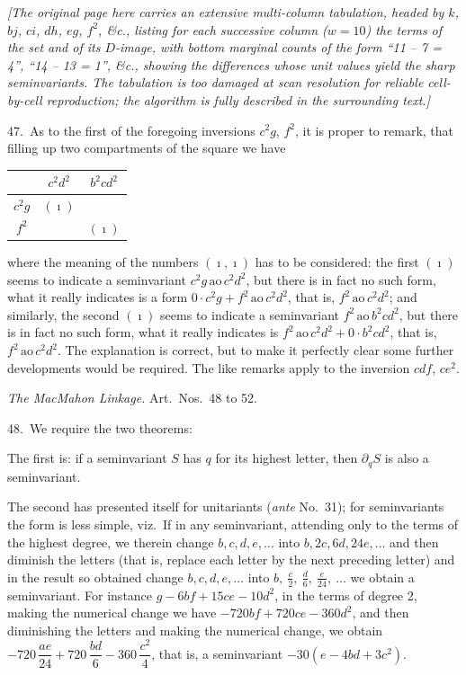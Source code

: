 \documentclass[11pt]{article}
\begin{document}
\bigskip
\noindent\textit{[The original page here carries an extensive multi-column tabulation, headed by $k$, $bj$, $ci$, $dh$, $eg$, $f^2$, \&c., listing for each successive column ($w=10$) the terms of the set and of its $D$-image, with bottom marginal counts of the form ``11 -- 7 = 4'', ``14 -- 13 = 1'', \&c., showing the differences whose unit values yield the sharp seminvariants. The tabulation is too damaged at scan resolution for reliable cell-by-cell reproduction; the algorithm is fully described in the surrounding text.]}

47.\ As to the first of the foregoing inversions $c^2 g$, $f^2$, it is proper to remark, that filling up two compartments of the square we have

\begin{center}
\begin{tabular}{c|cc}
 & $c^2 d^2$ & $b^2 c d^2$ \\
\hline
$c^2 g$ & $(\imath)$ & \\
$f^2$ & & $(\imath)$ \\
\end{tabular}
\end{center}

where the meaning of the numbers $(\imath, \imath)$ has to be considered: the first $(\imath)$ seems to indicate a seminvariant $c^2 g\,\mathrm{ao}\,c^2 d^2$, but there is in fact no such form, what it really indicates is a form $0\cdot c^2 g + f^2\,\mathrm{ao}\,c^2 d^2$, that is, $f^2\,\mathrm{ao}\,c^2 d^2$; and similarly, the second $(\imath)$ seems to indicate a seminvariant $f^2\,\mathrm{ao}\,b^2 c d^2$, but there is in fact no such form, what it really indicates is $f^2\,\mathrm{ao}\,c^2 d^2 + 0\cdot b^2 c d^2$, that is, $f^2\,\mathrm{ao}\,c^2 d^2$. The explanation is correct, but to make it perfectly clear some further developments would be required. The like remarks apply to the inversion $cdf$, $ce^2$.

\begin{center}
\textit{The MacMahon Linkage.} Art.\ Nos.\ 48 to 52.
\end{center}

48.\ We require the two theorems:

The first is: if a seminvariant $S$ has $q$ for its highest letter, then $\partial_q S$ is also a seminvariant.

The second has presented itself for unitariants (\textit{ante} No.\ 31); for seminvariants the form is less simple, viz.\ If in any seminvariant, attending only to the terms of the highest degree, we therein change $b, c, d, e, \ldots$ into $b, 2c, 6d, 24e, \ldots$ and then diminish the letters (that is, replace each letter by the next preceding letter) and in the result so obtained change $b, c, d, e, \ldots$ into $b,\ \tfrac{c}{2},\ \tfrac{d}{6},\ \tfrac{e}{24},\ \ldots$ we obtain a seminvariant. For instance $g - 6bf + 15ce - 10d^2$, in the terms of degree 2, making the numerical change we have $-720 bf + 720 ce - 360 d^2$, and then diminishing the letters and making the numerical change, we obtain $-720\,\dfrac{ae}{24} + 720\,\dfrac{bd}{6} - 360\,\dfrac{c^2}{4}$, that is, a seminvariant $-30(e - 4bd + 3c^2)$.
\end{document}
